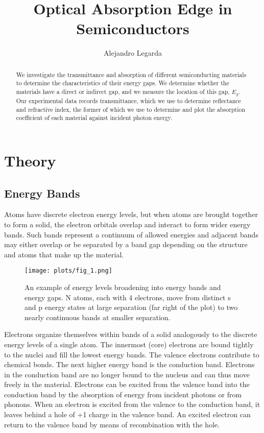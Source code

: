 \documentclass{article}
\title{Optical Absorption Edge in Semiconductors}
\author{Alejandro Legarda}
\begin{document}
  \raggedright
  \maketitle

\begin{abstract}
We investigate the transmittance and absorption of different semiconducting materials to determine the characteristics of their energy gaps. We determine whether the materials have a direct or indirect gap, and we measure the location of this gap, $E_g$. Our experimental data records transmittance, which we use to determine reflectance and refractive index, the former of which we use to determine and plot the absorption coefficient of each material against incident photon energy.
\end{abstract}


\tableofcontents
\newpage

\section{Theory}

\subsection{Energy Bands}

Atoms have discrete electron energy levels, but when atoms are brought together to form a solid, the electron orbitals overlap and interact to form wider energy bands. Such bands represent a continuum of allowed energies and adjacent bands may either overlap or be separated by a band gap depending on the structure and atoms that make up the material.\cite{lab manual}

\hspace{.25cm}


\begin{figure}[!htb]
	\centering
	\texttt{[image: plots/fig\_1.png]}
 	\label{bands}
	\caption{An example of energy levels broadening into energy bands and energy gaps. N atoms, each with 4 electrons, move from distinct s and p energy states at large separation (far right of the plot) to two nearly continuous bands at smaller separation.\cite{lab manual}}
\end{figure}

\hspace{.25cm}

Electrons organize themselves within bands of a solid analogously to the discrete energy levels of a single atom. The innermost (core) electrons are bound tightly to the nuclei and fill the lowest energy bands. The valence electrons contribute to chemical bonds. The next higher energy band is the conduction band. Electrons in the conduction band are no longer bound to the nucleus and can thus move freely in the material. Electrons can be excited from the valence band into the conduction band by the absorption of energy from incident photons or from phonons. When an electron is excited from the valence to the conduction band, it leaves behind a hole of +1 charge in the valence band. An excited electron can return to the valence band by means of recombination with the hole.
\end{document}
